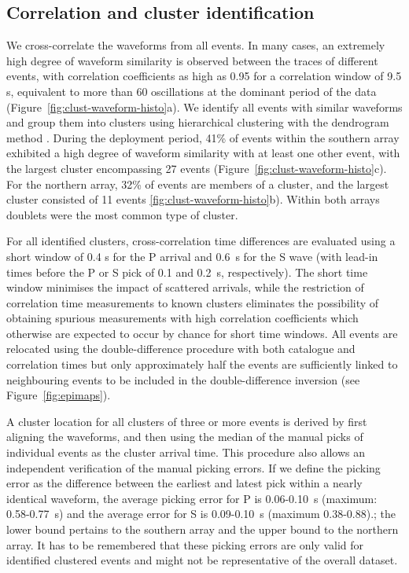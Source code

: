 \documentclass[reviewcopy]{elsart}
\begin{document}
\subsection{Correlation and cluster identification}

We cross-correlate the waveforms from all events.  In many cases, an
extremely high degree of waveform similarity is observed between the traces of
different events, with correlation coefficients 
as high as 0.95 for a correlation window of 9.5 s, equivalent to more
than 60 oscillations at the dominant period of the data (Figure~\ref{fig:clust-waveform-histo}a).
We identify
all events with similar waveforms and group them into clusters using
hierarchical clustering with the dendrogram method .  During the deployment
period, 41\% of events within the southern array exhibited a high
degree of waveform similarity with at least one other event, with the
largest cluster encompassing 27 events (Figure~\ref{fig:clust-waveform-histo}c). For the northern array,  32\%
of events are members of a cluster, and the largest cluster consisted
of 11 events \ref{fig:clust-waveform-histo}b).   Within 
both arrays doublets were the most common type of cluster.

For all identified clusters, cross-correlation time
differences are evaluated using a short window of 0.4 s for the P
arrival and 0.6~s for the S wave (with lead-in times before the P or S
pick of 0.1 and 0.2~s, respectively). The short time window minimises
the impact of scattered arrivals, while the restriction of correlation
time measurements to known clusters eliminates the possibility of
obtaining spurious measurements with high correlation coefficients
which otherwise are expected to occur by chance for short time windows.
All events are relocated using the double-difference procedure with
both catalogue and correlation times but only approximately half the
events are sufficiently linked to neighbouring events to be included
in the double-difference inversion (see Figure~\ref{fig:epimaps}).

A cluster location for all clusters of three or more events is derived
by first aligning the waveforms, and then using the median of the
manual picks of individual events as the cluster arrival time.  This
procedure also allows an independent verification of the manual
picking errors.  If we define the picking error as the difference
between the earliest and latest pick within a nearly identical
waveform, the average picking error for P is 0.06-0.10~s (maximum: 0.58-0.77~s)
and the average error for S is 0.09-0.10~s (maximum 0.38-0.88).; the
lower bound pertains to the southern array and the upper bound to the
northern array.  
 It has to be remembered that these picking errors are only valid for
 identified clustered events and might not be representative of the
 overall dataset. 
\end{document}

